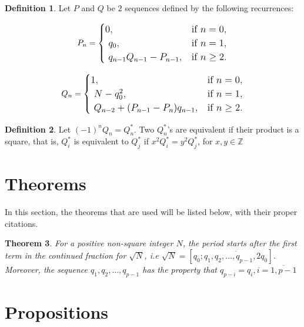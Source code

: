 \documentclass[12pt]{article}
\newtheorem{theorem}{Theorem}[section]
\theoremstyle{definition}
\newtheorem{definition}[theorem]{Definition}
\begin{document}
\begin{definition}
Let $P$ and $Q$ be $2$ sequences defined by the following recurrences: 

    \begin{equation}
        \large
        P_n = \begin{cases} 
            0, & \text{if } n = 0, \\\
            q_0, & \text{if } n = 1, \\\
            q_{n - 1} Q_{n - 1} - P_{n - 1}, & \text{if } n \geq 2.
        \end{cases}
    \end{equation}
    
    \begin{equation}
        \large
        Q_n = \begin{cases} 
            1, & \text{if } n = 0, \\\
            N - q_0^2, & \text{if } n = 1, \\\
            Q_{n - 2} + (P_{n - 1} - P_{n})q_{n - 1}, & \text{if } n \geq 2.
        \end{cases}
    \end{equation}
\end{definition}

\begin{definition}
    Let $(-1)^nQ_n=Q^*_n$. Two $Q^*_n$'s are equivalent if their product is a square, that is, $Q^*_i$ is equivalent to $Q^*_j$ if $x^2Q^*_i=y^2Q_j^*$, for $x, y \in \mathbb{Z}$
\end{definition}

\section{Theorems}
In this section, the theorems that are used will be listed below, with their proper citations.
\begin{theorem}
For a positive non-square integer $N$, the period starts after the first term in the continued fraction for $\sqrt{N}$, i.e $\sqrt{N}=[q_0;\overline{q_1, q_2,\ldots, q_{p - 1}, 2q_0}]$. Moreover, the sequence $q_1, q_2, \ldots, q_{p - 1}$ has the property that $q_{p-i}=q_i, i = \overline{1, p - 1}$ \cite{rose}
\end{theorem}

\section{Propositions}
\end{document}
